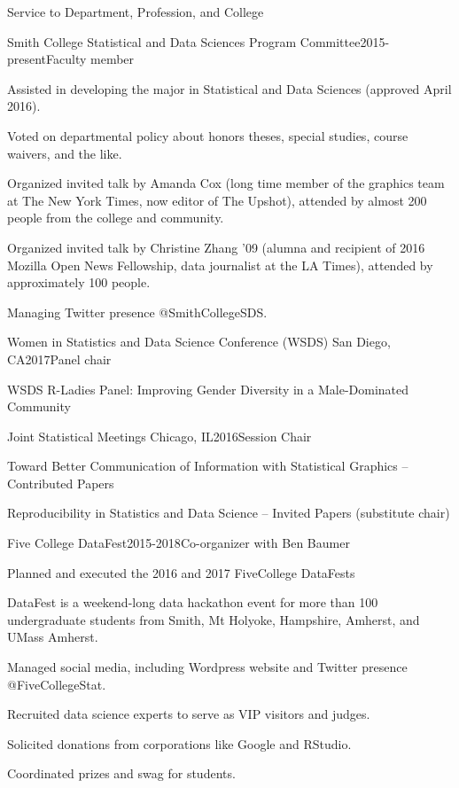 \documentclass{resume} %
\begin{document}
\begin{rSection}{Service to Department, Profession, and College}

%

\begin{rSubsection}{Smith College Statistical and Data Sciences Program Committee}{}{2015-present}{Faculty member}
\item Assisted in developing the major in Statistical and Data Sciences (approved April 2016).
\item Voted on departmental policy about honors theses, special studies, course waivers, and the like. 
\item Organized invited talk by Amanda Cox (long time member of the graphics team at The New York Times, now editor of The Upshot), attended by almost 200 people from the college and community. 
\item Organized invited talk by Christine Zhang '09 (alumna and recipient of 2016 Mozilla Open News Fellowship, data journalist at the LA Times), attended by approximately 100 people. 
\item Managing Twitter presence @SmithCollegeSDS. 
\end{rSubsection}


\begin{rSubsection}{Women in Statistics and Data Science Conference (WSDS)}{ San Diego, CA}{2017}{Panel chair}
\item WSDS R-Ladies Panel: Improving Gender Diversity in a Male-Dominated Community
\end{rSubsection}

\begin{rSubsection}{Joint Statistical Meetings}{ Chicago, IL}{2016}{Session Chair}
\item Toward Better Communication of Information with Statistical Graphics -- Contributed Papers
\item Reproducibility in Statistics and Data Science -- Invited Papers (substitute chair)
\end{rSubsection}

\begin{rSubsection}{Five College DataFest}{}{2015-2018}{Co-organizer with Ben Baumer }
\item Planned and executed the 2016 and 2017 FiveCollege DataFests
\item DataFest is a weekend-long data hackathon event for more than 100 undergraduate students from Smith, Mt Holyoke, Hampshire, Amherst, and UMass Amherst. 
\item Managed social media, including Wordpress website and Twitter presence @FiveCollegeStat. 
\item Recruited data science experts to serve as VIP visitors and judges. 
\item Solicited donations from corporations like Google and RStudio. 
\item Coordinated prizes and swag for students. 
\end{rSubsection}


\end{rSection}
\end{document}
